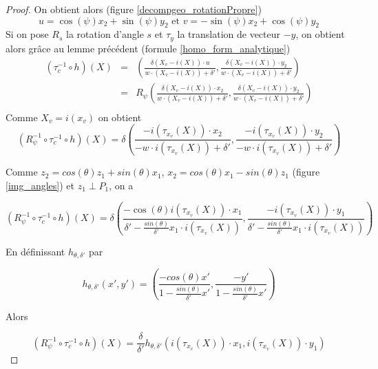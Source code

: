 \begin{proof}
On obtient alors (figure \ref{decompgeo_rotationPropre})
\begin{equation*}
u=\cos(\psi)x_{2}+\sin(\psi)y_{2} \text{ et } v=-\sin(\psi)x_{2}+\cos(\psi)y_{2}
\end{equation*}
Si on pose $R_{s}$ la rotation d'angle $s$ et $\tau_{y}$ la translation de vecteur $-y$, on obtient alors grâce au lemme précédent (formule \ref{homo_form_analytique})
\begin{eqnarray*}
(\tau_{c}^{-1} \circ h)(X) &=& \left(\frac{\delta (X_{v}-i(X))\cdot u }{w \cdot (X_{v}-i(X))+\delta'},\frac{\delta (X_{v}-i(X))\cdot y_{2}}{w \cdot (X_{v}-i(X))+\delta'}  \right) \\
                           &=& R_{\psi}\left(\frac{\delta (X_{v}-i(X))\cdot x_{2} }{w \cdot (X_{v}-i(X))+\delta'},\frac{\delta (X_{v}-i(X))\cdot y_{2}}{w \cdot (X_{v}-i(X))+\delta'}  \right) \\
\end{eqnarray*}
Comme  $X_{v}=i(x_{v})$ on obtient
\begin{equation*}
(R_{\psi}^{-1} \circ \tau_{c}^{-1}  \circ h)(X)=\delta \left(\frac{-i(\tau_{x_{v}} (X))\cdot x_{2} }{-w \cdot i(\tau_{x_{v}} (X))+\delta'},\frac{-i(\tau_{x_{v}} (X))\cdot y_{2}}{-w \cdot i(\tau_{x_{v}} (X))+\delta'}  \right) 
\end{equation*}

Comme $z_{2}=cos(\theta)z_{1}+sin(\theta)x_{1}$, $x_{2}=cos(\theta)x_{1}-sin(\theta)z_{1}$ (figure \ref{img_angles}) et $z_{1}\perp P_{1}$, on a

\begin{equation*}
(R_{\psi}^{-1} \circ \tau_{c}^{-1}  \circ h)(X)=\delta\left(\frac{-\cos(\theta)i(\tau_{x_{v}} (X))\cdot x_{1} }{\delta'-\frac{sin(\theta)}{\delta'}x_{1}\cdot i(\tau_{x_{v}}(X))}, \frac{-i(\tau_{x_{v}} (X))\cdot y_{1}}{\delta'-\frac{sin(\theta)}{\delta'}x_{1}\cdot i(\tau_{x_{v}}(X))}  \right) 
\end{equation*}

En définissant $h_{\theta,\delta'}$ par

\begin{equation*}
h_{\theta,\delta'}(x',y')=\left(\frac{-cos(\theta)x'}{1-\frac{sin(\theta)}{\delta'}x'} ,\frac{-y'}{1-\frac{sin(\theta)}{\delta'}x'}\right)
\end{equation*}

Alors 

\begin{equation*}
(R_{\psi}^{-1} \circ \tau_{c}^{-1} \circ h)(X)= \frac{\delta}{\delta'}h_{\theta,\delta'}\left ( i(\tau_{x_{v}}(X)) \cdot x_{1}, i(\tau_{x_{v}}(X)) \cdot y_{1}\right)
\end{equation*}


\end{proof}
